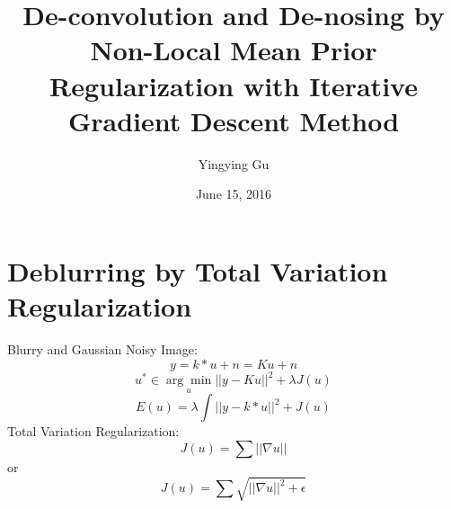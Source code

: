 \documentclass[paper=a4, fontsize=11pt]{scrartcl}
\begin{document}
\title{\color{bl} De-convolution and De-nosing by Non-Local Mean Prior Regularization with Iterative Gradient Descent Method}
\author{Yingying Gu}
\date{June 15, 2016}
\maketitle

\section{Deblurring by Total Variation Regularization}
Blurry and Gaussian Noisy Image:
\begin{equation}
y=k \ast u + n = Ku + n
\end{equation}
\begin{equation}
u^* \in \underset{u}{\arg\min} ||y-Ku||^2 + \lambda J(u)
\end{equation}
\begin{equation}
E(u) = \lambda \int ||y-k*u||^2 + J(u)
\end{equation}
Total Variation Regularization:
\begin{equation}
J(u)= \sum ||\nabla u||
\end{equation}
or
\begin{equation}
J(u)= \sum \sqrt{||\nabla u||^2+\epsilon}
\end{equation}
\end{document}
